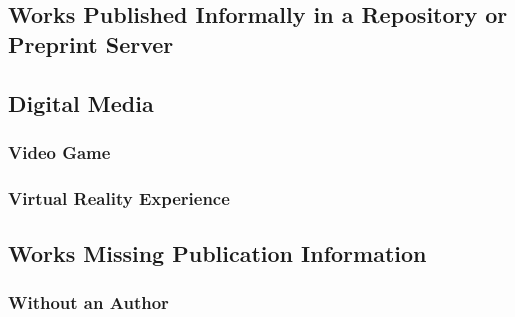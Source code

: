 \documentclass{ltxdockit}
\begin{document}

\subsection{Works Published Informally in a Repository or Preprint Server} %
\label{sec:works_published_informally_in_a_repository_or_preprint_server}
\begin{refsection}
	\printbibliography[heading=none]
\end{refsection}

\subsection{Digital Media} %
\label{sec:digital_media}
\subsubsection{Video Game} %
\label{sub:video_game}
\begin{refsection}
	\printbibliography[heading=none]
\end{refsection}
\subsubsection{Virtual Reality Experience} %
\label{sub:virtual_reality_experience}
\begin{refsection}
	\printbibliography[heading=none]
\end{refsection}

\subsection{Works Missing Publication Information} %
\label{sec:works_missing_publication_information}
\subsubsection{Without an Author} %
\label{sub:without_an_author}
\begin{refsection}
	\printbibliography[heading=none]
\end{refsection}
\end{document}
